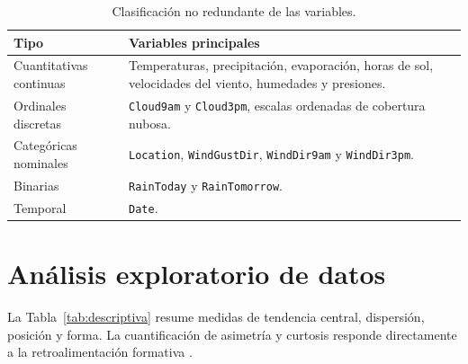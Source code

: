 \documentclass[11pt,a4paper]{article}
\begin{document}
\begin{table}[H]
\centering
\footnotesize
\caption{Clasificación no redundante de las variables.}
\label{tab:tipos}
\begin{tabular}{p{3.3cm}p{11.4cm}}
\toprule
Tipo & Variables principales \\
\midrule
Cuantitativas continuas &
Temperaturas, precipitación, evaporación, horas de sol, velocidades del viento, humedades y presiones. \\
Ordinales discretas &
\texttt{Cloud9am} y \texttt{Cloud3pm}, escalas ordenadas de cobertura nubosa. \\
Categóricas nominales &
\texttt{Location}, \texttt{WindGustDir}, \texttt{WindDir9am} y \texttt{WindDir3pm}. \\
Binarias &
\texttt{RainToday} y \texttt{RainTomorrow}. \\
Temporal &
\texttt{Date}. \\
\bottomrule
\end{tabular}
\end{table}

\section{Análisis exploratorio de datos}

La Tabla~\ref{tab:descriptiva} resume medidas de tendencia central, dispersión, posición y forma. La cuantificación de asimetría y curtosis responde directamente a la retroalimentación formativa \cite{maidanaforma}.

\begin{table}[H]
\centering
\scriptsize
\caption{Estadística descriptiva de variables meteorológicas seleccionadas.}
\label{tab:descriptiva}
\end{table}
\end{document}
